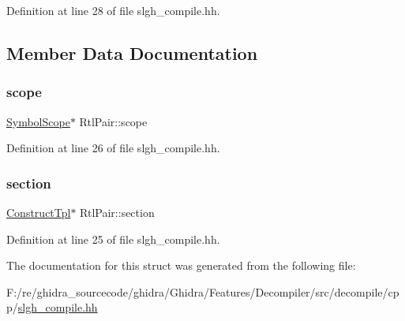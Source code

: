 Definition at line 28 of file slgh\+\_\+compile.\+hh.



\subsection{Member Data Documentation}
\mbox{\label{struct_rtl_pair_af8f9a3537ba20e94c08491d3fed84969}} 
\subsubsection{\texorpdfstring{scope}{scope}}
{\footnotesize\ttfamily \mbox{\hyperlink{class_symbol_scope}{Symbol\+Scope}}$\ast$ Rtl\+Pair\+::scope}



Definition at line 26 of file slgh\+\_\+compile.\+hh.

\mbox{\label{struct_rtl_pair_a83b3e82db716d0b9e452e89be19f9e76}} 
\subsubsection{\texorpdfstring{section}{section}}
{\footnotesize\ttfamily \mbox{\hyperlink{class_construct_tpl}{Construct\+Tpl}}$\ast$ Rtl\+Pair\+::section}



Definition at line 25 of file slgh\+\_\+compile.\+hh.



The documentation for this struct was generated from the following file\+:\begin{DoxyCompactItemize}
\item 
F\+:/re/ghidra\+\_\+sourcecode/ghidra/\+Ghidra/\+Features/\+Decompiler/src/decompile/cpp/\mbox{\hyperlink{slgh__compile_8hh}{slgh\+\_\+compile.\+hh}}\end{DoxyCompactItemize}
